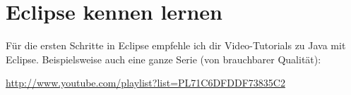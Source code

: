 % 
% 
% 



\section{Eclipse kennen lernen}

Für die ersten Schritte in Eclipse empfehle ich dir Video-Tutorials zu Java mit Eclipse.
Beispielsweise auch eine ganze Serie (von brauchbarer Qualität):

\url{http://www.youtube.com/playlist?list=PL71C6DFDDF73835C2}
